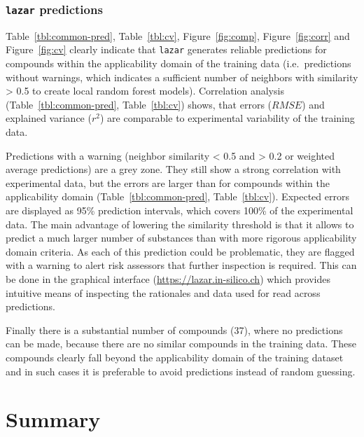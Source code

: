 \documentclass[]{achemso}
\begin{document}
\subsubsection{\texorpdfstring{\texttt{lazar}
predictions}{lazar predictions}}\label{lazar-predictions}

Table~\ref{tbl:common-pred}, Table~\ref{tbl:cv}, Figure~\ref{fig:comp},
Figure~\ref{fig:corr} and Figure~\ref{fig:cv} clearly indicate that
\texttt{lazar} generates reliable predictions for compounds within the
applicability domain of the training data (i.e.~predictions without
warnings, which indicates a sufficient number of neighbors with
similarity \textgreater{} 0.5 to create local random forest models).
Correlation analysis (Table~\ref{tbl:common-pred}, Table~\ref{tbl:cv})
shows, that errors (\(RMSE\)) and explained variance (\(r^2\)) are
comparable to experimental variability of the training data.

Predictions with a warning (neighbor similarity \textless{} 0.5 and
\textgreater{} 0.2 or weighted average predictions) are a grey zone.
They still show a strong correlation with experimental data, but the
errors are larger than for compounds within the applicability domain
(Table~\ref{tbl:common-pred}, Table~\ref{tbl:cv}). Expected errors are
displayed as 95\% prediction intervals, which covers 100\% of the
experimental data. The main advantage of lowering the similarity
threshold is that it allows to predict a much larger number of
substances than with more rigorous applicability domain criteria. As
each of this prediction could be problematic, they are flagged with a
warning to alert risk assessors that further inspection is required.
This can be done in the graphical interface
(\url{https://lazar.in-silico.ch}) which provides intuitive means of
inspecting the rationales and data used for read across predictions.

Finally there is a substantial number of compounds (37), where no
predictions can be made, because there are no similar compounds in the
training data. These compounds clearly fall beyond the applicability
domain of the training dataset and in such cases it is preferable to
avoid predictions instead of random guessing.

\section{Summary}\label{summary}
\end{document}
